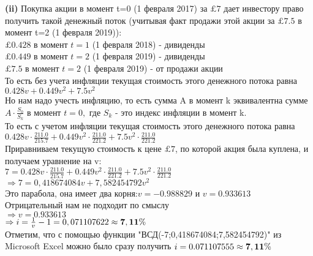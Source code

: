 \documentclass{article}
\begin{document}
{\bf \large  (ii)} Покупка акции  в момент t=0 (1 февраля 2017)  за $\pounds 7 $ дает инвестору право получить такой денежный поток (учитывая факт продажи этой акции за   $ \pounds 7.5  $  в момент t=2 (1 февраля 2019)):\\


$\pounds 0.428$ в момент $t=1$  (1 февраля 2018) - дивиденды\\
$\pounds 0.449$ в момент $t=2$  (1 февраля 2019) - дивиденды\\
$\pounds 7.5   $ в момент $t=2$  (1 февраля 2019) - от продажи акции \\

То есть без учета инфляции  текущая стоимость этого денежного потока равна $0.428v + 0.449v^{2} + 7.5v^{2}$\\

Но нам надо учесть инфляцию, то есть сумма A в момент k эквивалентна сумме  
$A \cdot  \frac {S_0}{S_k}$  в момент  $t=0,$ где $S_k$ - это индекс инфляции в момент k.\\

То есть с  учетом инфляции  текущая стоимость этого денежного потока равна
 $0.428v \cdot \frac {211.0}{215.7} + 0.449v^{2} \cdot \frac {211.0}{221.2}  + 7.5v^{2}  \cdot \frac {211.0}{221.2}$\\
 
Приравниваем текущую стоимость к цене $ \pounds 7$, по которой акция была куплена, и получаем уравнение на v:\\

$7=0.428v \cdot \frac {211.0}{215.7} + 0.449v^{2} \cdot \frac {211.0}{221.2}  + 7.5v^{2}  \cdot \frac {211.0}{221.2}$\\

$ \Rightarrow 7=0,418674084v + 7,582454792v^2$\\

Это парабола, она имеет два корня:$ v= -0.988829$ и $ v= 0.933613$\\

Отрицательный нам не подходит по смыслу \\

$\Rightarrow v=0.933613 $\\
$ \Rightarrow  i  = \frac {1}{v} - 1 = 0,071107622 \approx  \bf 7,11\%$\\

Отметим, что с помощью функции  "ВСД({-7;0,418674084;7,582454792})"   из Microsoft Excel можно было сразу получить $i=0.071107555   \approx  \bf 7,11\%$\\
\end{document}
